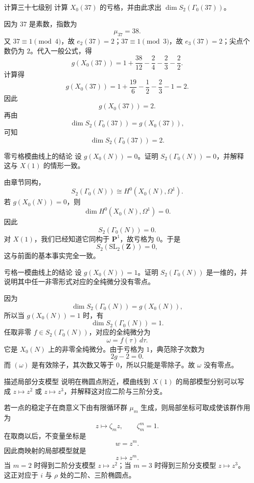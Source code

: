 \begin{problem}{计算三十七级别}
\hard
计算 $X_0(37)$ 的亏格，并由此求出 $\dim S_2(\Gamma_0(37))$。
\end{problem}
\begin{solution}
因为 $37$ 是素数，指数为
\[
\mu_{37}=38.
\]
又 $37\equiv1\pmod4$，故 $e_2(37)=2$；$37\equiv1\pmod3$，故 $e_3(37)=2$；尖点个数仍为 $2$。代入一般公式，得
\[
g(X_0(37))=1+\frac{38}{12}-\frac24-\frac23-\frac22.
\]
计算得
\[
g(X_0(37))=1+\frac{19}{6}-\frac12-\frac23-1=2.
\]
因此
\[
g(X_0(37))=2.
\]
再由
\[
\dim S_2(\Gamma_0(37))=g(X_0(37)),
\]
可知
\[
\dim S_2(\Gamma_0(37))=2.
\]
\end{solution}

\begin{problem}{零亏格模曲线上的结论}
\hard
设 $g(X_0(N))=0$。证明 $S_2(\Gamma_0(N))=0$，并解释这与 $X(1)$ 的情形一致。
\end{problem}
\begin{solution}
由章节同构，
\[
S_2(\Gamma_0(N))\cong H^0(X_0(N),\Omega^1).
\]
若 $g(X_0(N))=0$，则
\[
\dim H^0(X_0(N),\Omega^1)=0.
\]
因此
\[
S_2(\Gamma_0(N))=0.
\]
对 $X(1)$，我们已经知道它同构于 $\mathbf P^1$，故亏格为 $0$。于是
\[
S_2(\mathrm{SL}_2(\mathbf Z))=0,
\]
这与前面的基本事实完全一致。
\end{solution}

\begin{problem}{亏格一模曲线上的结论}
\hard
设 $g(X_0(N))=1$。证明 $S_2(\Gamma_0(N))$ 是一维的，并说明其中任一非零形式对应的全纯微分没有零点。
\end{problem}
\begin{solution}
因为
\[
\dim S_2(\Gamma_0(N))=g(X_0(N)),
\]
所以当 $g(X_0(N))=1$ 时，有
\[
\dim S_2(\Gamma_0(N))=1.
\]
任取非零 $f\in S_2(\Gamma_0(N))$，对应的全纯微分为
\[
\omega=f(\tau)\,d\tau.
\]
它是 $X_0(N)$ 上的非零全纯微分。由于亏格为 $1$，典范除子次数为
\[
2g-2=0.
\]
而 $(\omega)$ 是有效除子，其次数又等于 $0$，所以只能是零除子。故 $\omega$ 没有零点。
\end{solution}

\begin{problem}{描述局部分支模型}
\hard
说明在椭圆点附近，模曲线到 $X(1)$ 的局部模型分别可以写成 $z\mapsto z^2$ 或 $z\mapsto z^3$，并解释这对应二阶与三阶分支。
\end{problem}
\begin{solution}
若一点的稳定子在商意义下由有限循环群 $\mu_m$ 生成，则局部坐标可取成使该群作用为
\[
z\longmapsto \zeta_m z,
\qquad \zeta_m^m=1.
\]
在取商以后，不变量坐标是
\[
w=z^m.
\]
因此商映射的局部模型就是
\[
z\longmapsto z^m.
\]
当 $m=2$ 时得到二阶分支模型 $z\mapsto z^2$；当 $m=3$ 时得到三阶分支模型 $z\mapsto z^3$。这正对应于 $i$ 与 $\rho$ 处的二阶、三阶椭圆点。
\end{solution}

